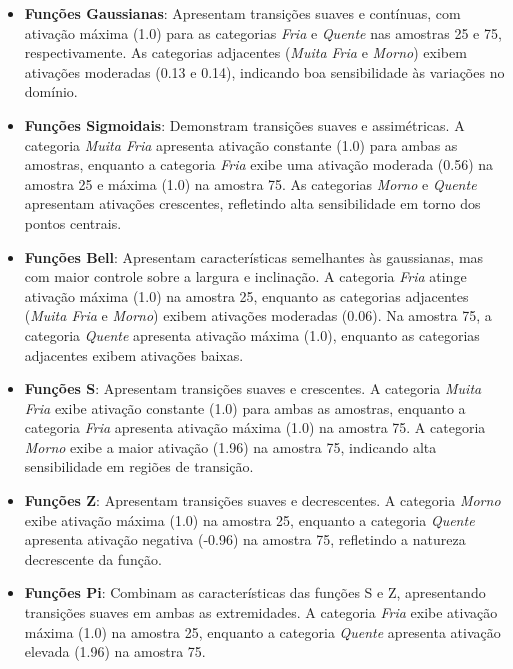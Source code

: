 \documentclass[a4paper,12pt]{article}
\begin{document}
\begin{itemize}
    \item \textbf{Funções Gaussianas}: Apresentam transições suaves e contínuas, com ativação máxima (1.0) para as categorias \textit{Fria} e \textit{Quente} nas amostras 25 e 75, respectivamente. As categorias adjacentes (\textit{Muita Fria} e \textit{Morno}) exibem ativações moderadas (0.13 e 0.14), indicando boa sensibilidade às variações no domínio.

    \item \textbf{Funções Sigmoidais}: Demonstram transições suaves e assimétricas. A categoria \textit{Muita Fria} apresenta ativação constante (1.0) para ambas as amostras, enquanto a categoria \textit{Fria} exibe uma ativação moderada (0.56) na amostra 25 e máxima (1.0) na amostra 75. As categorias \textit{Morno} e \textit{Quente} apresentam ativações crescentes, refletindo alta sensibilidade em torno dos pontos centrais.

    \item \textbf{Funções Bell}: Apresentam características semelhantes às gaussianas, mas com maior controle sobre a largura e inclinação. A categoria \textit{Fria} atinge ativação máxima (1.0) na amostra 25, enquanto as categorias adjacentes (\textit{Muita Fria} e \textit{Morno}) exibem ativações moderadas (0.06). Na amostra 75, a categoria \textit{Quente} apresenta ativação máxima (1.0), enquanto as categorias adjacentes exibem ativações baixas.

    \item \textbf{Funções S}: Apresentam transições suaves e crescentes. A categoria \textit{Muita Fria} exibe ativação constante (1.0) para ambas as amostras, enquanto a categoria \textit{Fria} apresenta ativação máxima (1.0) na amostra 75. A categoria \textit{Morno} exibe a maior ativação (1.96) na amostra 75, indicando alta sensibilidade em regiões de transição.

    \item \textbf{Funções Z}: Apresentam transições suaves e decrescentes. A categoria \textit{Morno} exibe ativação máxima (1.0) na amostra 25, enquanto a categoria \textit{Quente} apresenta ativação negativa (-0.96) na amostra 75, refletindo a natureza decrescente da função.

    \item \textbf{Funções Pi}: Combinam as características das funções S e Z, apresentando transições suaves em ambas as extremidades. A categoria \textit{Fria} exibe ativação máxima (1.0) na amostra 25, enquanto a categoria \textit{Quente} apresenta ativação elevada (1.96) na amostra 75.


\end{itemize}
\end{document}

